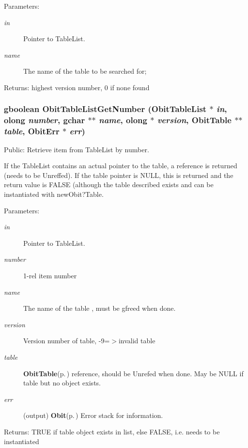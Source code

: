 \begin{Desc}
\item[Parameters:]
\begin{description}
\item[{\em in}]Pointer to Table\-List. \item[{\em name}]The name of the table to be searched for; \end{description}
\end{Desc}
\begin{Desc}
\item[Returns:]highest version number, 0 if none found \end{Desc}
\subsubsection{\setlength{\rightskip}{0pt plus 5cm}gboolean Obit\-Table\-List\-Get\-Number ({\bf Obit\-Table\-List} $\ast$ {\em in}, {\bf olong} {\em number}, gchar $\ast$$\ast$ {\em name}, {\bf olong} $\ast$ {\em version}, {\bf Obit\-Table} $\ast$$\ast$ {\em table}, {\bf Obit\-Err} $\ast$ {\em err})}\label{ObitTableList_8h_a14}


Public: Retrieve item from Table\-List by number. 

If the Table\-List contains an actual pointer to the table, a reference is returned (needs to be Unreffed). If the table pointer is NULL, this is returned and the return value is FALSE (although the table described exists and can be instantiated with new\-Obit?Table. \begin{Desc}
\item[Parameters:]
\begin{description}
\item[{\em in}]Pointer to Table\-List. \item[{\em number}]1-rel item number \item[{\em name}]The name of the table , must be gfreed when done. \item[{\em version}]Version number of table, -9=$>$invalid table \item[{\em table}]{\bf Obit\-Table}{\rm (p.\,\pageref{structObitTable})} reference, should be Unrefed when done. May be NULL if table but no object exists. \item[{\em err}](output) {\bf Obit}{\rm (p.\,\pageref{structObit})} Error stack for information. \end{description}
\end{Desc}
\begin{Desc}
\item[Returns:]TRUE if table object exists in list, else FALSE, i.e. needs to be instantiated \end{Desc}
